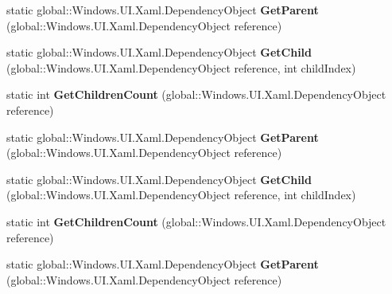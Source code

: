 \begin{DoxyCompactItemize}
static global\+::\+Windows.\+U\+I.\+Xaml.\+Dependency\+Object {\bfseries Get\+Parent} (global\+::\+Windows.\+U\+I.\+Xaml.\+Dependency\+Object reference)
\item 
\mbox{\label{class_windows_1_1_u_i_1_1_xaml_1_1_media_1_1_visual_tree_helper_a3a4a777df4fdf53b1c650f8072c9cdf7}} 
static global\+::\+Windows.\+U\+I.\+Xaml.\+Dependency\+Object {\bfseries Get\+Child} (global\+::\+Windows.\+U\+I.\+Xaml.\+Dependency\+Object reference, int child\+Index)
\item 
\mbox{\label{class_windows_1_1_u_i_1_1_xaml_1_1_media_1_1_visual_tree_helper_a9856a6b0d01e09cdc7047af1d0dc4188}} 
static int {\bfseries Get\+Children\+Count} (global\+::\+Windows.\+U\+I.\+Xaml.\+Dependency\+Object reference)
\item 
\mbox{\label{class_windows_1_1_u_i_1_1_xaml_1_1_media_1_1_visual_tree_helper_a9aac21ec03d8e2464c23d385bb664a28}} 
static global\+::\+Windows.\+U\+I.\+Xaml.\+Dependency\+Object {\bfseries Get\+Parent} (global\+::\+Windows.\+U\+I.\+Xaml.\+Dependency\+Object reference)
\item 
\mbox{\label{class_windows_1_1_u_i_1_1_xaml_1_1_media_1_1_visual_tree_helper_a3a4a777df4fdf53b1c650f8072c9cdf7}} 
static global\+::\+Windows.\+U\+I.\+Xaml.\+Dependency\+Object {\bfseries Get\+Child} (global\+::\+Windows.\+U\+I.\+Xaml.\+Dependency\+Object reference, int child\+Index)
\item 
\mbox{\label{class_windows_1_1_u_i_1_1_xaml_1_1_media_1_1_visual_tree_helper_a9856a6b0d01e09cdc7047af1d0dc4188}} 
static int {\bfseries Get\+Children\+Count} (global\+::\+Windows.\+U\+I.\+Xaml.\+Dependency\+Object reference)
\item 
\mbox{\label{class_windows_1_1_u_i_1_1_xaml_1_1_media_1_1_visual_tree_helper_a9aac21ec03d8e2464c23d385bb664a28}} 
static global\+::\+Windows.\+U\+I.\+Xaml.\+Dependency\+Object {\bfseries Get\+Parent} (global\+::\+Windows.\+U\+I.\+Xaml.\+Dependency\+Object reference)

\end{DoxyCompactItemize}
